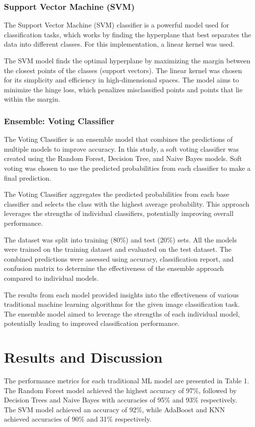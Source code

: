 \documentclass[10pt,twocolumn,letterpaper]{article}
\begin{document}
\subsubsection{Support Vector Machine (SVM)}

The Support Vector Machine (SVM) classifier is a powerful model used for classification tasks, which works by finding the hyperplane that best separates the data into different classes. For this implementation, a linear kernel was used.

The SVM model finds the optimal hyperplane by maximizing the margin between the closest points of the classes (support vectors). The linear kernel was chosen for its simplicity and efficiency in high-dimensional spaces. The model aims to minimize the hinge loss, which penalizes misclassified points and points that lie within the margin.

\subsubsection{Ensemble: Voting Classifier}

The Voting Classifier is an ensemble model that combines the predictions of multiple models to improve accuracy. In this study, a soft voting classifier was created using the Random Forest, Decision Tree, and Naive Bayes models. Soft voting was chosen to use the predicted probabilities from each classifier to make a final prediction.

The Voting Classifier aggregates the predicted probabilities from each base classifier and selects the class with the highest average probability. This approach leverages the strengths of individual classifiers, potentially improving overall performance.

The dataset was split into training (80\%) and test (20\%) sets. All the models were trained on the training dataset and evaluated on the test dataset. The combined predictions were assessed using accuracy, classification report, and confusion matrix to determine the effectiveness of the ensemble approach compared to individual models.

The results from each model provided insights into the effectiveness of various traditional machine learning algorithms for the given image classification task. The ensemble model aimed to leverage the strengths of each individual model, potentially leading to improved classification performance.



\section{Results and Discussion}
The performance metrics for each traditional ML model are presented in Table 1. The Random Forest model achieved the highest accuracy of 97\%, followed by Decision Trees and Naive Bayes with accuracies of 95\% and 93\% respectively. The SVM model achieved an accuracy of 92\%, while AdaBoost and KNN achieved accuracies of 90\% and 31\% respectively.
\end{document}
